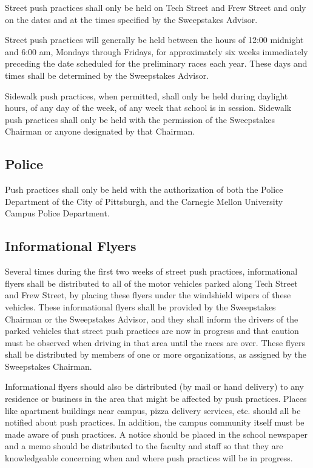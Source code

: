 	Street push practices shall only be held on Tech Street and Frew Street and
	only on the dates and at the times specified by the Sweepstakes Advisor.

	Street push practices will generally be held between the hours of 12:00
	midnight and 6:00 am, Mondays through Fridays, for approximately six weeks
	immediately preceding the date scheduled for the preliminary races each year.
	These days and times shall be determined by the Sweepstakes Advisor.

	Sidewalk push practices, when permitted, shall only be held during daylight
	hours, of any day of the week, of any week that school is in session. Sidewalk
	push practices shall only be held with the permission of the Sweepstakes
	Chairman or anyone designated by that Chairman.

\subsection{Police}

	Push practices shall only be held with the authorization of both the Police
	Department of the City of Pittsburgh, and the Carnegie Mellon University Campus
	Police Department.

\subsection{Informational Flyers}

	Several times during the first two weeks of street push practices,
	informational flyers shall be distributed to all of the motor vehicles parked
	along Tech Street and Frew Street, by placing these flyers under the windshield
	wipers of these vehicles. These informational flyers shall be provided by the
	Sweepstakes Chairman or the Sweepstakes Advisor, and they shall inform the
	drivers of the parked vehicles that street push practices are now in progress
	and that caution must be observed when driving in that area until the races are
	over. These flyers shall be distributed by members of one or more
	organizations, as assigned by the Sweepstakes Chairman.

	Informational flyers should also be distributed (by mail or hand delivery) to
	any residence or business in the area that might be affected by push practices.
	Places like apartment buildings near campus, pizza delivery services, etc.
	should all be notified about push practices. In addition, the campus community
	itself must be made aware of push practices. A notice should be placed in the
	school newspaper and a memo should be distributed to the faculty and staff so
	that they are knowledgeable concerning when and where push practices will be in
	progress.

